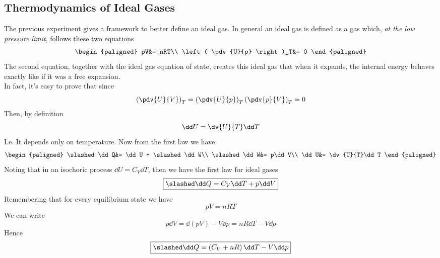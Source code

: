 \documentclass[../qm.tex]{subfiles}
\begin{document}
\subsection{Thermodynamics of Ideal Gases}
The previous experiment gives a framework to better define an ideal gas. In general an ideal gas is defined as a gas which, \textit{at the low pressure limit}, follows these two equations
\begin{equation}
	\begin{paligned}
		pV&= nRT\\
		\left( \pdv{U}{p} \right)_T&= 0
	\end{paligned}
	\label{eq:idealgas.ig}
\end{equation}
The second equation, together with the ideal gas equation of state, creates this ideal gas that when it expands, the internal energy behaves exactly like if it was a free expansion.\\
In fact, it's easy to prove that since
\begin{equation}
	\left( \pdv{U}{V} \right)_T=\left( \pdv{U}{p} \right)_T\left( \pdv{p}{V} \right)_T=0
\end{equation}
Then, by definition
\begin{equation}
	\dd U = \dv{U}{T}\dd T
	\label{eq:idealinten.ig}
\end{equation}
I.e. It depends only on temperature. Now from the first law we have
\begin{equation}
	\begin{paligned}
		\slashed\dd Q&= \dd U + \slashed\dd W\\
		\slashed\dd W&= p\dd V\\
		\dd U&= \dv{U}{T}\dd T
	\end{paligned}
\end{equation}
Noting that in an isochoric process $\dd U = C_V\dd T$, then we have the first law for ideal gases
\begin{equation}
	\boxed{\slashed\dd Q=C_V\dd T+p\dd V}
	\label{eq:1stlawv.ig}
\end{equation}
Remembering that for every equilibrium state we have
\begin{equation*}
	pV=nRT
\end{equation*}
We can write
\begin{equation*}
	p\dd V=\dd\left( pV \right)-V\dd p= nR\dd T-V\dd p
\end{equation*}
Hence
\begin{equation}
	\boxed{\slashed\dd Q=\left( C_V+nR \right)\dd T-V\dd p}
	\label{eq:1stlawp.ig}
\end{equation}
\end{document}
